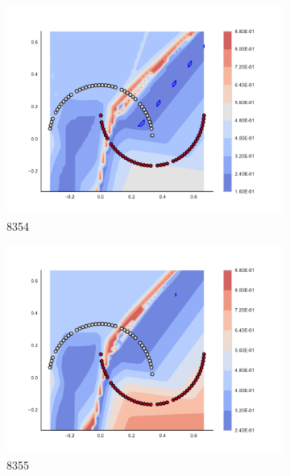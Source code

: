 \begin{figure}[h]
\begin{subfigure}[b]{0.09\textwidth}
    \includegraphics[clip, trim=2.35cm 1.75cm 4.5cm 0cm,width=\textwidth]{img/convergence/8354.pdf}
    \caption{8354}
    \label{fig:convergence_8354}
\end{subfigure}
%
\begin{subfigure}[b]{0.09\textwidth}
    \includegraphics[clip, trim=2.35cm 1.75cm 4.5cm 0cm,width=\textwidth]{img/convergence/8355.pdf}
    \caption{8355}
    \label{fig:convergence_8355}
\end{subfigure}
%
\begin{subfigure}[b]{0.09\textwidth}

\end{subfigure}
\end{figure}
